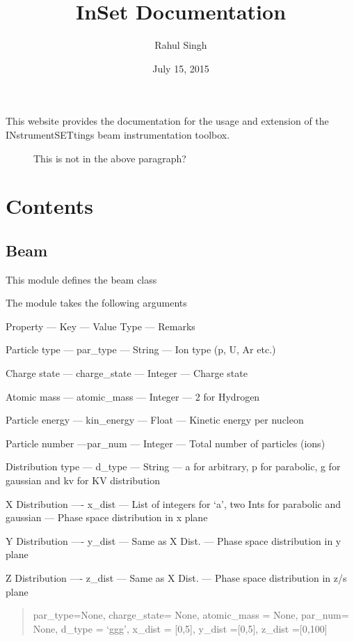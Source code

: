 \documentclass[letterpaper,10pt,english]{sphinxmanual}
\title{InSet Documentation}
\date{July 15, 2015}
\author{Rahul Singh}
\begin{document}
\maketitle
\tableofcontents
{}\label{index::doc}

\begin{description}
\item[{This website provides the documentation for the usage and extension of the INstrumentSETtings beam instrumentation toolbox.}] \leavevmode
This is not in the above paragraph?

\end{description}


\chapter{Contents}
\label{index:contents}\label{index:welcome-to-inset}\label{index:index-label}

\section{Beam}
\label{beam:module-beam}\label{beam:beam}\label{beam::doc}\label{beam:beam-label}
This module defines the beam class

The module takes the following arguments

Property --- Key --- Value Type --- Remarks

Particle type --- par\_type --- String --- Ion type (p, U, Ar etc.)

Charge state --- charge\_state --- Integer --- Charge state

Atomic mass --- atomic\_mass ---  Integer --- 2 for Hydrogen

Particle energy --- kin\_energy --- Float --- Kinetic energy per nucleon

Particle number ---par\_num --- Integer --- Total number of particles (ions)

Distribution type --- d\_type --- String --- a for arbitrary, p for parabolic, g for gaussian and kv for KV distribution

X Distribution ---- x\_dist --- List of integers for `a', two Ints for parabolic and gaussian --- Phase space distribution in x plane

Y Distribution ---- y\_dist --- Same as X Dist. --- Phase space distribution in y plane

Z Distribution ---- z\_dist --- Same as X Dist. --- Phase space distribution in z/s plane
\begin{quote}

par\_type=None, charge\_state= None, atomic\_mass = None, par\_num= None, d\_type = `ggg', x\_dist = {[}0,5{]}, y\_dist ={[}0,5{]}, z\_dist ={[}0,100{]}
\end{quote}
\end{document}
